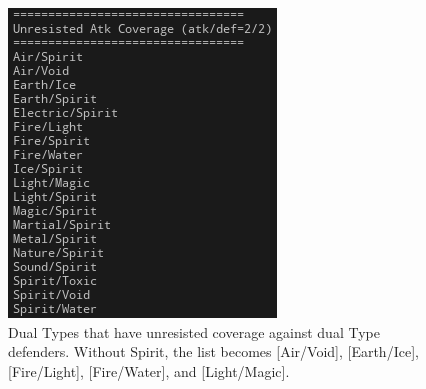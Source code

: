 

\begin{figure}
	\centering
	\includegraphics[scale=2]{unresisted-2v2}
	\caption{Dual Types that have unresisted coverage against dual Type defenders. Without Spirit, the list becomes [Air/Void], [Earth/Ice], [Fire/Light], [Fire/Water], and [Light/Magic].}
\end{figure}


